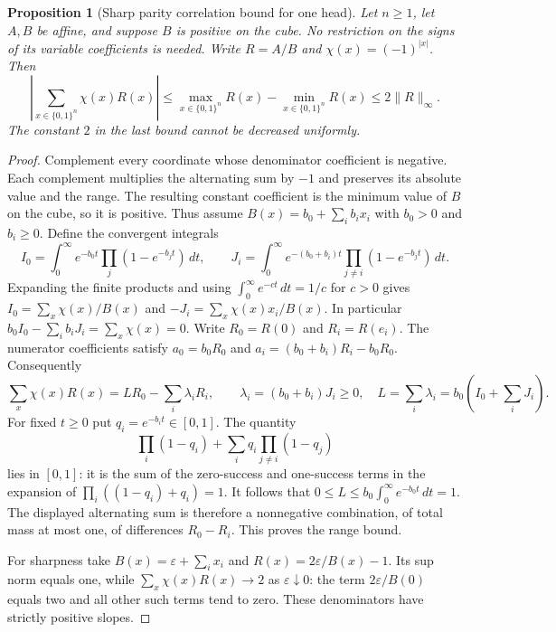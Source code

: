 \documentclass[11pt]{article}
\newtheorem{proposition}{Proposition}
\newcommand{\Qn}{\{0,1\}^n}
\begin{document}
\begin{proposition}[Sharp parity correlation bound for one head]
Let $n\ge1$, let $A,B$ be affine, and suppose $B$ is positive on the
cube. No restriction on the signs of its variable coefficients is needed.
Write $R=A/B$ and $\chi(x)=(-1)^{|x|}$. Then
\[
 \left|\sum_{x\in\Qn}\chi(x)R(x)\right|
 \le \max_{x\in\Qn}R(x)-\min_{x\in\Qn}R(x)
 \le 2\|R\|_\infty.
\]
The constant $2$ in the last bound cannot be decreased uniformly.
\end{proposition}
\begin{proof}
Complement every coordinate whose denominator coefficient is negative.
Each complement multiplies the alternating sum by $-1$ and preserves
its absolute value and the range. The resulting constant coefficient is
the minimum value of $B$ on the cube, so it is positive. Thus assume
$B(x)=b_0+\sum_i b_ix_i$ with $b_0>0$ and $b_i\ge0$.
Define the convergent integrals
\[
 I_0=\int_0^\infty e^{-b_0t}\prod_j(1-e^{-b_jt})\,dt,
 \qquad
 J_i=\int_0^\infty e^{-(b_0+b_i)t}
                \prod_{j\ne i}(1-e^{-b_jt})\,dt.
\]
Expanding the finite products and using
$\int_0^\infty e^{-ct}\,dt=1/c$ for $c>0$ gives
$I_0=\sum_x\chi(x)/B(x)$ and
$-J_i=\sum_x\chi(x)x_i/B(x)$.
In particular $b_0I_0-\sum_i b_iJ_i=\sum_x\chi(x)=0$.
Write $R_0=R(0)$ and $R_i=R(e_i)$. The numerator coefficients satisfy
$a_0=b_0R_0$ and $a_i=(b_0+b_i)R_i-b_0R_0$. Consequently
\[
 \sum_x\chi(x)R(x)
 =L R_0-\sum_i\lambda_iR_i,
 \qquad
 \lambda_i=(b_0+b_i)J_i\ge0,
 \quad L=\sum_i\lambda_i=b_0\left(I_0+\sum_iJ_i\right).
\]
For fixed $t\ge0$ put $q_i=e^{-b_it}\in[0,1]$. The quantity
\[
 \prod_i(1-q_i)+\sum_i q_i\prod_{j\ne i}(1-q_j)
\]
lies in $[0,1]$: it is the sum of the zero-success and one-success
terms in the expansion of $\prod_i((1-q_i)+q_i)=1$.
It follows that $0\le L\le b_0\int_0^\infty e^{-b_0t}\,dt=1$.
The displayed alternating sum is therefore a nonnegative combination,
of total mass at most one, of differences $R_0-R_i$. This proves the
range bound.

For sharpness take $B(x)=\varepsilon+\sum_i x_i$ and
$R(x)=2\varepsilon/B(x)-1$. Its sup norm equals one, while
$\sum_x\chi(x)R(x)\to2$ as $\varepsilon\downarrow0$: the term
$2\varepsilon/B(0)$ equals two and all other such terms tend to zero.
These denominators have strictly positive slopes.
\end{proof}
\end{document}
